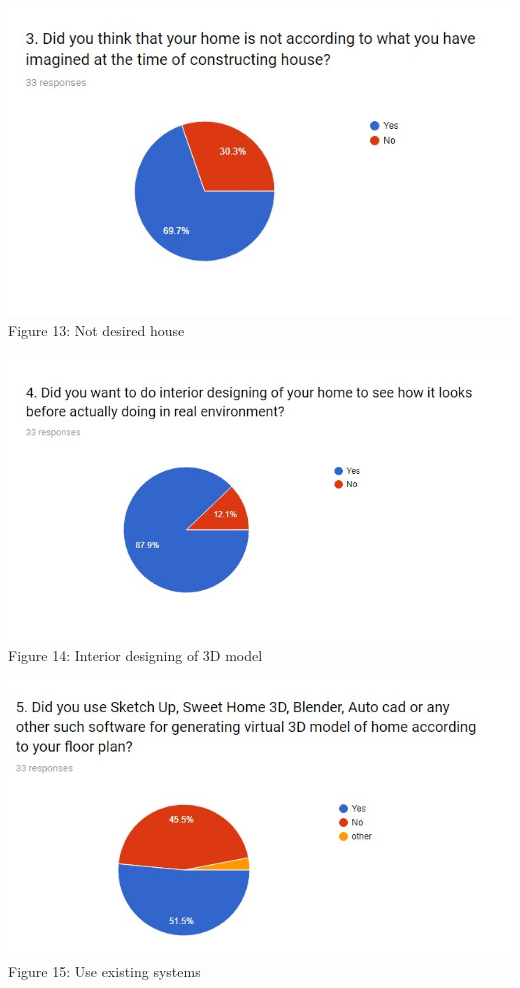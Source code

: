 \documentclass{article}
\begin{document}
\begin{center}
\includegraphics[scale=0.7]{graph3}
\\Figure 13: Not desired house
\end{center}

\begin{center}
\includegraphics[scale=0.7]{graph4}
\\Figure 14: Interior designing of 3D model
\end{center}

\begin{center}
\includegraphics[scale=0.7]{graph5}
\\Figure 15: Use existing systems
\end{center}
\end{document}

